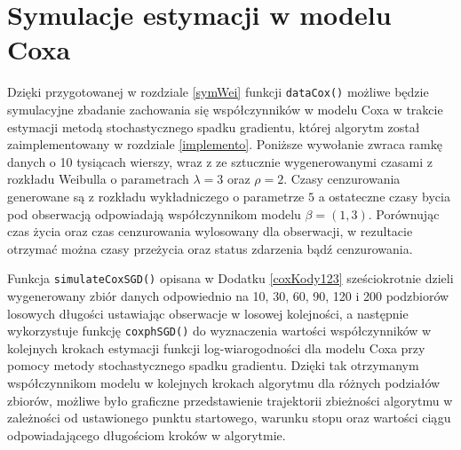 \section{Symulacje estymacji w modelu Coxa}

Dzięki przygotowanej w rozdziale \ref{symWei} funkcji \texttt{dataCox()} możliwe będzie symulacyjne zbadanie zachowania się współczynników w modelu Coxa w trakcie estymacji metodą stochastycznego spadku gradientu, której algorytm został zaimplementowany w rozdziale \ref{implemento}. Poniższe wywołanie zwraca ramkę danych o 10 tysiącach wierszy, wraz z ze sztucznie wygenerowanymi czasami z rozkładu Weibulla o parametrach $\lambda =3$ oraz $\rho =2$. Czasy cenzurowania generowane są z rozkładu wykładniczego o parametrze $5$ a ostateczne czasy bycia pod obserwacją odpowiadają współczynnikom modelu $\beta = (1,3)$. Porównując czas życia oraz czas cenzurowania wylosowany dla obserwacji, w rezultacie otrzymać można czasy przeżycia oraz status zdarzenia bądź cenzurowania. 
\begin{Shaded}
\begin{Highlighting}[]
\StringTok{ }\NormalTok{(}\NormalTok{(}\NormalTok{:}\NormalTok{, } \NormalTok{, } \NormalTok{), } \NormalTok{)}
\StringTok{ }\NormalTok{(}\NormalTok{^}\NormalTok{, } \NormalTok{, }  \NormalTok{(}\NormalTok{,}\NormalTok{), } \NormalTok{) }
\end{Highlighting}
\end{Shaded}
Funkcja \texttt{simulateCoxSGD()} opisana w Dodatku \ref{coxKody123} sześciokrotnie dzieli wygenerowany zbiór danych odpowiednio na 10, 30, 60, 90, 120 i 200 podzbiorów losowych długości ustawiając obserwacje w losowej kolejności, a następnie wykorzystuje funkcję \texttt{coxphSGD()} do wyznaczenia wartości współczynników w kolejnych krokach estymacji funkcji log-wiarogodności dla modelu Coxa przy pomocy metody stochastycznego spadku gradientu. Dzięki tak otrzymanym współczynnikom modelu w kolejnych krokach algorytmu dla różnych podziałów zbiorów, możliwe było graficzne przedstawienie trajektorii zbieżności algorytmu w zależności od ustawionego punktu startowego, warunku stopu oraz wartości ciągu odpowiadającego długościom kroków w algorytmie. 

